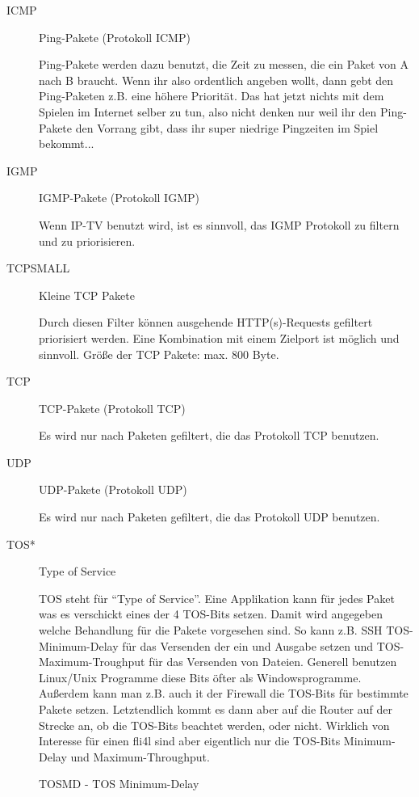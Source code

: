 \begin{description}
\begin{description}
 \item[ICMP] Ping-Pakete (Protokoll ICMP)

   Ping-Pakete werden dazu benutzt, die Zeit zu messen, die ein Paket von
   A nach B braucht. Wenn ihr also ordentlich angeben wollt, dann gebt
   den Ping-Paketen z.B. eine höhere Priorität. Das hat jetzt nichts mit
   dem Spielen im Internet selber zu tun, also nicht denken nur weil ihr
   den Ping-Pakete den Vorrang gibt, dass ihr super niedrige Pingzeiten im
   Spiel bekommt...

 \item[IGMP] IGMP-Pakete (Protokoll IGMP)

   Wenn IP-TV benutzt wird, ist es sinnvoll, das IGMP Protokoll zu filtern
   und zu priorisieren.

 \item[TCPSMALL] Kleine TCP Pakete

   Durch diesen Filter können ausgehende HTTP(s)-Requests gefiltert priorisiert
   werden. Eine Kombination mit einem Zielport ist möglich und sinnvoll.
   Größe der TCP Pakete: max. 800 Byte.

 \item[TCP]    TCP-Pakete (Protokoll TCP)

   Es wird nur nach Paketen gefiltert, die das Protokoll TCP benutzen.

 \item[UDP]  UDP-Pakete (Protokoll UDP)

   Es wird nur nach Paketen gefiltert, die das Protokoll UDP benutzen.


 \item[TOS*] Type of Service

   TOS steht für ``Type of Service''. Eine Applikation kann für jedes
   Paket was es verschickt eines der 4 TOS-Bits setzen. Damit wird
   angegeben welche Behandlung für die Pakete vorgesehen sind. So kann
   z.B. SSH TOS-Minimum-Delay für das Versenden der ein und Ausgabe
   setzen und TOS-Maximum-Troughput für das Versenden von Dateien.
   Generell benutzen Linux/Unix Programme diese Bits öfter als
   Windowsprogramme. Außerdem kann man z.B. auch it der Firewall die
   TOS-Bits für bestimmte Pakete setzen. Letztendlich kommt es dann
   aber auf die Router auf der Strecke an, ob die TOS-Bits beachtet
   werden, oder nicht.  Wirklich von Interesse für einen fli4l sind
   aber eigentlich nur die TOS-Bits Minimum-Delay und
   Maximum-Throughput.

   \begin{description}
   \item [TOSMD - TOS Minimum-Delay]


\end{description}
\end{description}
\end{description}
